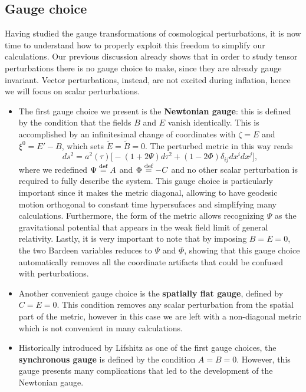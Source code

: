 \subsection{Gauge choice}\label{sec:gauge_choice}
Having studied the gauge transformations of cosmological perturbations, it is now time to understand how to properly exploit this freedom to simplify our calculations. Our previous discussion already shows that in order to study tensor perturbations there is no gauge choice to make, since they are already gauge invariant. Vector perturbations, instead, are not excited during inflation, hence we will focus on scalar perturbations.
\begin{itemize}
    \item The first gauge choice we present is the \textbf{Newtonian gauge}: this is defined by the condition that the fields $B$ and $E$ vanish identically. This is accomplished by an infinitesimal change of coordinates with $\zeta = E$ and $\xi^0=E'-B$, which sets $\tilde E=\tilde B=0$. The perturbed metric in this way reads 
    \begin{equation}
    ds^2=a^2(\tau)\bigg[-(1+2\Psi)d\tau^2+(1-2\Phi)\delta_{ij}dx^idx^j\bigg],
    \end{equation}
    where we redefined $\Psi\stackrel{\text{def}}{=} A$ and $\Phi\stackrel{\text{def}}{=} -C$ and no other scalar perturbation is required to fully describe the system. This gauge choice is particularly important since it makes the metric diagonal, allowing to have geodesic motion orthogonal to constant time hypersufaces and simplifying many calculations. Furthermore, the form of the metric allows recognizing $\Psi$ as the gravitational potential that appears in the weak field limit of general relativity. Lastly, it is very important to note that by imposing $B=E=0$, the two Bardeen variables reduces to $\Psi$ and $\Phi$, showing that this gauge choice automatically removes all the coordinate artifacts that could be confused with perturbations.
    \item    Another convenient gauge choice is the \textbf{spatially flat gauge}, defined by $C=E=0$. This condition removes any scalar perturbation from the spatial part of the metric, however in this case we are left with a non-diagonal metric which is not convenient in many calculations.
    \item
    Historically introduced by Lifshitz as one of the first gauge choices, the \textbf{synchronous gauge} is defined by the condition $A=B=0$. However, this gauge presents many complications that led to the development of the Newtonian gauge.

\end{itemize}
